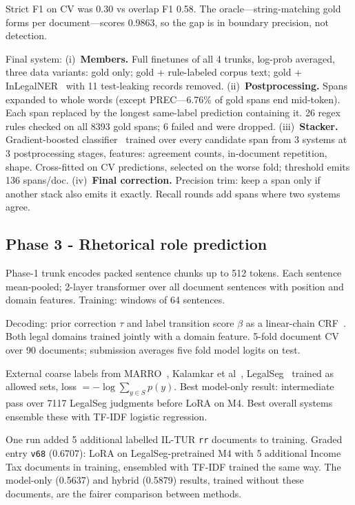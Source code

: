 \documentclass[11pt, oneside]{article}
\begin{document}
Strict F1 on CV was 0.30 vs overlap F1 0.58. The oracle---string-matching gold forms per
document---scores 0.9863, so the gap is in boundary precision, not detection.

Final system: (i)~\textbf{Members.} Full finetunes of all 4 trunks, log-prob averaged, three data
variants: gold only; gold + rule-labeled corpus text; gold + InLegalNER~\citep{kalamkar2022ner} with 11
test-leaking records removed. (ii)~\textbf{Postprocessing.} Spans expanded to whole words (except
PREC---6.76\% of gold spans end mid-token). Each span replaced by the longest same-label prediction
containing it. 26 regex rules checked on all 8393 gold spans; 6 failed and were dropped.
(iii)~\textbf{Stacker.} Gradient-boosted classifier~\citep{ke2017lightgbm} trained over every candidate
span from 3 systems at 3 postprocessing stages, features: agreement counts, in-document repetition,
shape. Cross-fitted on CV predictions, selected on the worse fold; threshold emits 136 spans/doc.
(iv)~\textbf{Final correction.} Precision trim: keep a span only if another stack also emits it
exactly. Recall rounds add spans where two systems agree.

\subsection{Phase 3 - Rhetorical role prediction}
Phase-1 trunk encodes packed sentence chunks up to 512 tokens. Each sentence mean-pooled; 2-layer
transformer over all document sentences with position and domain features. Training: windows of 64
sentences.

Decoding: prior correction $\tau$ and label transition score $\beta$ as a linear-chain
CRF~\citep{lafferty2001crf}. Both legal domains trained jointly with a domain feature. 5-fold document CV
over 90 documents; submission averages five fold model logits on test.

External coarse labels from MARRO~\citep{bhattacharya2019rr}, Kalamkar et al~\citep{kalamkar2022rr},
LegalSeg~\citep{nigam2025legalseg} trained as allowed sets, loss $= -\log \sum_{y \in S} p(y)$. Best
model-only result: intermediate pass over 7117 LegalSeg judgments before LoRA on M4. Best overall
systems ensemble these with TF-IDF logistic regression.

One run added 5 additional labelled IL-TUR \texttt{rr} documents to training. Graded entry
\texttt{v68} (0.6707): LoRA on LegalSeg-pretrained M4 with 5 additional Income Tax documents in
training, ensembled with TF-IDF trained the same way. The model-only (0.5637) and hybrid (0.5879)
results, trained without these documents, are the fairer comparison between methods.
\end{document}
